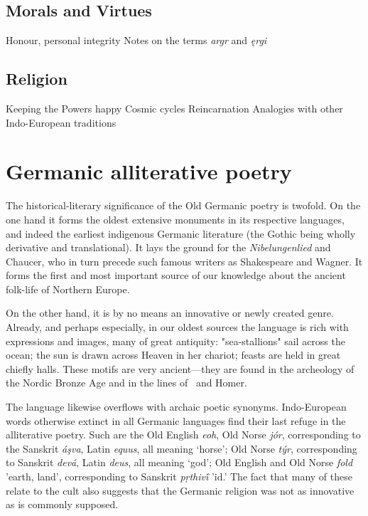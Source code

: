   \subsection{Morals and Virtues}
    Honour, personal integrity
    Notes on the terms \emph{argr} and \emph{ęrgi}
  \subsection{Religion}
    Keeping the Powers happy
    Cosmic cycles
    Reincarnation
    Analogies with other Indo-European traditions


\section{Germanic alliterative poetry}

  The historical-literary significance of the Old Germanic poetry is twofold. On the one hand it forms the oldest extensive monuments in its respective languages, and indeed the earliest indigenous Germanic literature (the Gothic being wholly derivative and translational).  It lays the ground for the \emph{Nibelungenlied} and Chaucer, who in turn precede such famous writers as Shakespeare and Wagner.  It forms the first and most important source of our knowledge about the ancient folk-life of Northern Europe.

  On the other hand, it is by no means an innovative or newly created genre. Already, and perhaps especially, in our oldest sources the language is rich with expressions and images, many of great antiquity: "sea-stallions" sail across the ocean; the sun is drawn across Heaven in her chariot; feasts are held in great chiefly halls. These motifs are very ancient—they are found in the archeology of the Nordic Bronze Age and in the lines of \Rigveda\ and Homer.

  The language likewise overflows with archaic poetic synonyms.  Indo-European words otherwise extinct in all Germanic languages find their last refuge in the alliterative poetry.  Such are the Old English \emph{eoh}, Old Norse \emph{jór}, corresponding to the Sanskrit \emph{áşva}, Latin \emph{equus}, all meaning ‘horse’; Old Norse \emph{týr}, corresponding to Sanskrit \emph{devá}, Latin \emph{deus}, all meaning ‘god’; Old English and Old Norse \emph{fold} 'earth, land', corresponding to Sanskrit \emph{pṛthivī́} 'id.'  The fact that many of these relate to the cult also suggests that the Germanic religion was not as innovative as is commonly supposed.

